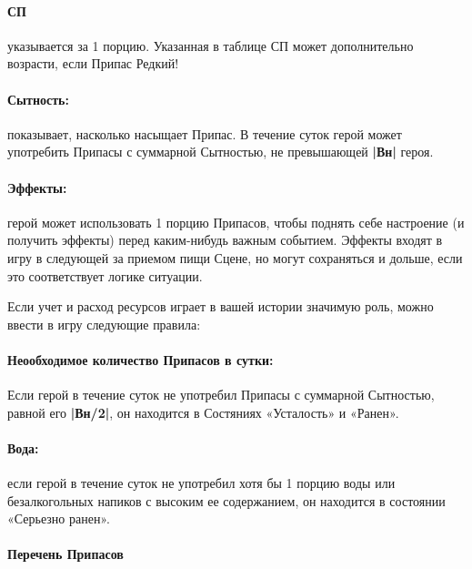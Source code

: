 \paragraph{СП} указывается за 1 порцию. Указанная в таблице СП может дополнительно возрасти, если Припас Редкий!
\paragraph{Сытность:} показывает, насколько насыщает Припас. В течение суток герой может употребить Припасы с суммарной Сытностью, не превышающей \textbf{|Вн|} героя.
\paragraph{Эффекты:} герой может использовать 1 порцию Припасов, чтобы поднять себе настроение (и получить эффекты) перед каким-нибудь важным событием. Эффекты входят в игру в следующей за приемом пищи Сцене, но могут сохраняться и дольше, если это соответствует логике ситуации.
\begin{tcolorbox}
    Если учет и расход ресурсов играет в вашей истории значимую роль, можно ввести в игру следующие правила:
    \paragraph{Неообходимое количество Припасов в сутки:} Если герой в течение суток не употребил Припасы с суммарной Сытностью, равной его \textbf{|Вн/2|}, он находится в Состяниях «Усталость» и «Ранен».
    \paragraph{Вода:} если герой в течение суток не употребил хотя бы 1 порцию воды или безалкогольных напиков с высоким ее содержанием, он находится в состоянии «Серьезно ранен».
\end{tcolorbox}
\paragraph{Перечень Припасов}




